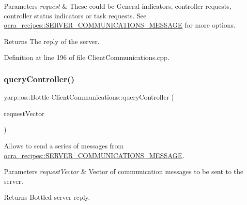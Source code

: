 \begin{DoxyParams}{Parameters}
{\em request} & These could be General indicators, controller requests, controller status indicators or task requests. See \hyperlink{namespaceocra__recipes_ae6246916f1927f7a201cc153ad76b07d}{ocra\+\_\+recipes\+::\+S\+E\+R\+V\+E\+R\+\_\+\+C\+O\+M\+M\+U\+N\+I\+C\+A\+T\+I\+O\+N\+S\+\_\+\+M\+E\+S\+S\+A\+GE} for more options.\\
\hline
\end{DoxyParams}
\begin{DoxyReturn}{Returns}
The reply of the server. 
\end{DoxyReturn}


Definition at line 196 of file Client\+Communications.\+cpp.

\hypertarget{classocra__recipes_1_1ClientCommunications_a12e293ab0cd846cf44f20a1fc61f82dc}{}\label{classocra__recipes_1_1ClientCommunications_a12e293ab0cd846cf44f20a1fc61f82dc} 
\subsubsection{\texorpdfstring{query\+Controller()}{queryController()}\hspace{0.1cm}{\footnotesize\ttfamily [3/3]}}
{\footnotesize\ttfamily yarp\+::os\+::\+Bottle Client\+Communications\+::query\+Controller (\begin{DoxyParamCaption}\item[{const std\+::vector$<$ \hyperlink{namespaceocra__recipes_ae6246916f1927f7a201cc153ad76b07d}{S\+E\+R\+V\+E\+R\+\_\+\+C\+O\+M\+M\+U\+N\+I\+C\+A\+T\+I\+O\+N\+S\+\_\+\+M\+E\+S\+S\+A\+GE} $>$}]{request\+Vector }\end{DoxyParamCaption})}

Allows to send a series of messages from \hyperlink{namespaceocra__recipes_ae6246916f1927f7a201cc153ad76b07d}{ocra\+\_\+recipes\+::\+S\+E\+R\+V\+E\+R\+\_\+\+C\+O\+M\+M\+U\+N\+I\+C\+A\+T\+I\+O\+N\+S\+\_\+\+M\+E\+S\+S\+A\+GE}.


\begin{DoxyParams}{Parameters}
{\em request\+Vector} & Vector of communication messages to be sent to the server.\\
\hline
\end{DoxyParams}
\begin{DoxyReturn}{Returns}
Bottled server reply. 
\end{DoxyReturn}


